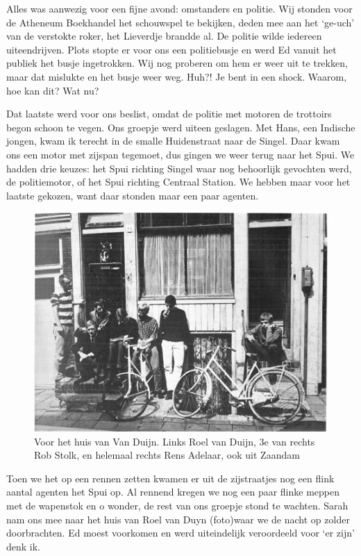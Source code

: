 \documentclass[10pt,twoside, openright]{memoir}
\begin{document}
Alles was aanwezig voor een fijne avond: omstanders en politie. Wij stonden voor de Atheneum Boekhandel het schouwspel te bekijken, deden mee aan het ‘ge-uch’ van de verstokte roker, het Lieverdje brandde al. De politie wilde iedereen uiteendrijven. Plots stopte er voor ons een politiebusje en werd Ed vanuit het publiek het busje ingetrokken. Wij nog proberen om hem er weer uit te trekken, maar dat mislukte en het busje weer weg. Huh?! Je bent in een shock. Waarom, hoe kan dit? Wat nu? 

Dat laatste werd voor ons beslist, omdat de politie met motoren de trottoirs begon schoon te vegen. Ons groepje werd uiteen geslagen. Met Hans, een Indische jongen, kwam ik terecht in de smalle Huidenstraat naar de Singel. Daar kwam ons een motor met zijspan tegemoet, dus gingen we weer terug naar het Spui. We hadden drie keuzes: het Spui richting Singel waar nog behoorlijk gevochten werd, de politiemotor, of het Spui richting Centraal Station. We hebben maar voor het laatste gekozen, want daar stonden maar een paar agenten. 


\begin{figure}
\includegraphics[width=\textwidth]{img/ch27/duyn002prov01ill10}
\caption*{\footnotesize Voor het huis van Van Duijn. Links Roel van Duijn, 3e van rechts Rob Stolk, en helemaal rechts Rens Adelaar, ook uit Zaandam}
\end{figure}

Toen we het op een rennen zetten kwamen er uit de zijstraatjes nog een flink aantal agenten het Spui op. Al rennend kregen we nog een paar flinke meppen met de wapenstok en o wonder, de rest van ons groepje stond te wachten. Sarah nam ons mee naar het huis van Roel van Duyn (foto)waar we de nacht op zolder doorbrachten. Ed moest voorkomen en werd uiteindelijk veroordeeld voor ‘er zijn’ denk ik. 
\end{document}
